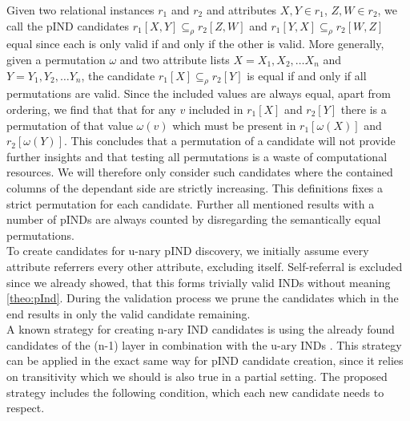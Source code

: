 Given two relational instances $r_1$ and $r_2$ and attributes $X, Y \in r_1$, $Z, W \in r_2$, we call the pIND candidates $r_1[X,Y] \subseteq_\rho r_2[Z,W]$ and $r_1[Y,X] \subseteq_\rho r_2[W,Z]$ equal since each is only valid if and only if the other is valid. More generally, given a permutation $\omega$ and two attribute lists $X = X_1, X_2, \dots X_n$ and $Y = Y_1, Y_2, \dots Y_n$, the candidate $r_1[X] \subseteq_\rho r_2[Y]$ is equal if and only if all permutations are valid. Since the included values are always equal, apart from ordering, we find that that for any $v$ included in $r_1[X]$ and $r_2[Y]$ there is a permutation of that value $\omega(v)$ which must be present in $r_1[\omega(X)]$ and $r_2[\omega(Y)]$. This concludes that a permutation of a candidate will not provide further insights and that testing all permutations is a waste of computational resources. We will therefore only consider such candidates where the contained columns of the dependant side are strictly increasing. This definitions fixes a strict permutation for each candidate. Further all mentioned results with a number of pINDs are always counted by disregarding the semantically equal permutations.\\

\noindent To create candidates for u-nary pIND discovery, we initially assume every attribute referrers every other attribute, excluding itself. Self-referral is excluded since we already showed, that this forms trivially valid INDs without meaning \ref{theo:pInd}. During the validation process we prune the candidates which in the end results in only the valid candidate remaining. \\

\noindent A known strategy for creating n-ary IND candidates is using the already found candidates of the (n-1) layer in combination with the u-ary INDs \cite{papenbrock2015divide}. This strategy can be applied in the exact same way for pIND candidate creation, since it relies on transitivity which we should is also true in a partial setting. The proposed strategy includes the following condition, which each new candidate needs to respect. \\

